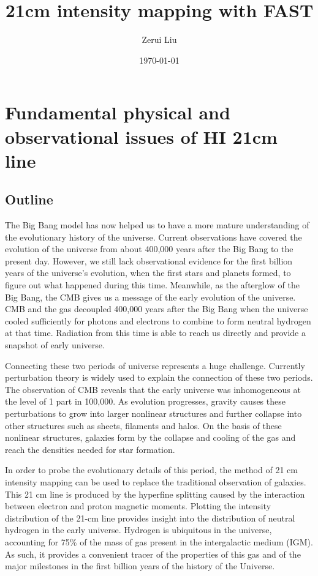 \documentclass{article}
\title{21cm intensity mapping with FAST}
\author{Zerui Liu}
\date{\today}
\begin{document}
\maketitle
\tableofcontents
\section{Fundamental physical and observational issues of HI 21cm line}
\subsection{Outline}
The Big Bang model has now helped us to have a more mature understanding of the evolutionary history of the universe. Current observations have covered the evolution of the universe from about 400,000 years after the Big Bang to the present day. However, we still lack observational evidence for the first billion years of the universe's evolution, when the first stars and planets formed, to figure out what happened during this time. Meanwhile, as the afterglow of the Big Bang, the CMB gives us a message of the early evolution of the universe. CMB and the gas decoupled 400,000 years after the Big Bang when the universe cooled sufficiently for photons and electrons to combine to form neutral hydrogen at that time. Radiation from this time is able to reach us directly and provide a snapshot of early universe.

Connecting these two periods of universe represents a huge challenge. Currently perturbation theory is widely used to explain the connection of these two periods. The observation of CMB reveals that the early universe was inhomogeneous at the level of 1 part in 100,000. As evolution progresses, gravity causes these perturbations to grow into larger nonlinear structures and further collapse into other structures such as sheets, filaments and halos. On the basis of these nonlinear structures, galaxies form by the collapse and cooling of the gas and reach the densities needed for star formation.

In order to probe the evolutionary details of this period, the method of 21 cm intensity mapping can be used to replace the traditional observation of galaxies. This 21 cm line is produced by the hyperfine splitting caused by the interaction between electron and proton magnetic moments. Plotting the intensity distribution of the 21-cm line provides insight into the distribution of neutral hydrogen in the early universe. Hydrogen is ubiquitous in the universe, accounting for 75\% of the mass of gas present in the intergalactic medium (IGM). As such, it provides a convenient tracer of the properties of this gas and of the major milestones in the first billion years of the history of the Universe.
\end{document}
